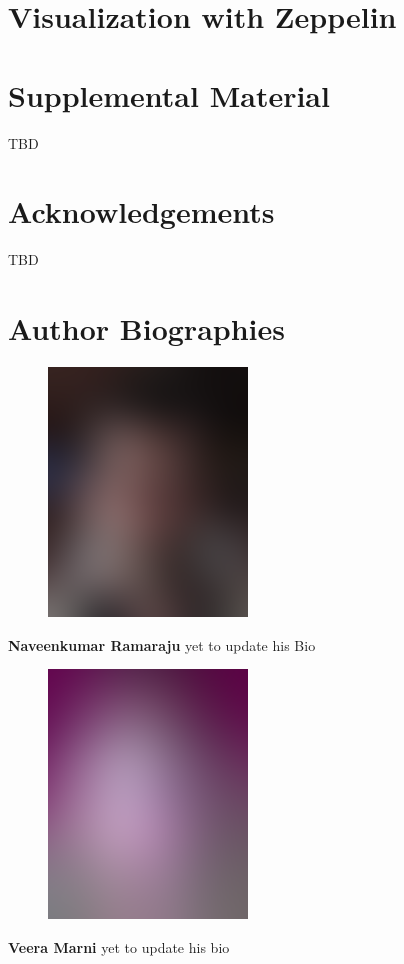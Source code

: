 \documentclass[9pt,twocolumn,twoside]{../../styles/osajnl}
\begin{document}
\section{Visualization with Zeppelin}



\section{Supplemental Material}
TBD

\section*{Acknowledgements}

TBD




 
\section*{Author Biographies}
\begingroup
\setlength\intextsep{0pt}
\begin{minipage}[t][3.2cm][t]{1.0\columnwidth} %
  \begin{figure}
    \includegraphics[width=0.25\columnwidth]{images/john_smith.eps}
  \end{figure}
  \noindent
  {\bfseries Naveenkumar Ramaraju} yet to update his Bio\end{minipage}
\begin{minipage}[t][3.2cm][t]{1.0\columnwidth} %
  \begin{figure}
    \includegraphics[width=0.25\columnwidth]{images/alice_smith.eps}
  \end{figure}
  \noindent
  {\bfseries Veera Marni} yet to update his bio
\end{minipage}

\endgroup

\newpage

\appendix
\end{document}
